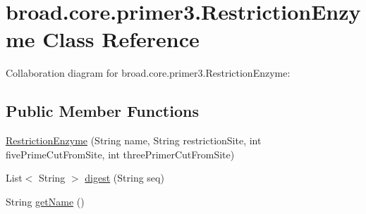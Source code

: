 \hypertarget{classbroad_1_1core_1_1primer3_1_1_restriction_enzyme}{\section{broad.\+core.\+primer3.\+Restriction\+Enzyme Class Reference}
\label{classbroad_1_1core_1_1primer3_1_1_restriction_enzyme}
}


Collaboration diagram for broad.\+core.\+primer3.\+Restriction\+Enzyme\+:
\subsection*{Public Member Functions}
\begin{DoxyCompactItemize}
\item 
\hyperlink{classbroad_1_1core_1_1primer3_1_1_restriction_enzyme_aaded8e596e9aff21494b95f21929f6ba}{Restriction\+Enzyme} (String name, String restriction\+Site, int five\+Prime\+Cut\+From\+Site, int three\+Primer\+Cut\+From\+Site)
\item 
List$<$ String $>$ \hyperlink{classbroad_1_1core_1_1primer3_1_1_restriction_enzyme_a5ad8163a0a912dad9188e0147fe95675}{digest} (String seq)
\item 
String \hyperlink{classbroad_1_1core_1_1primer3_1_1_restriction_enzyme_afee2b972470c63791ff0240893c2a5d5}{get\+Name} ()
\end{DoxyCompactItemize}
